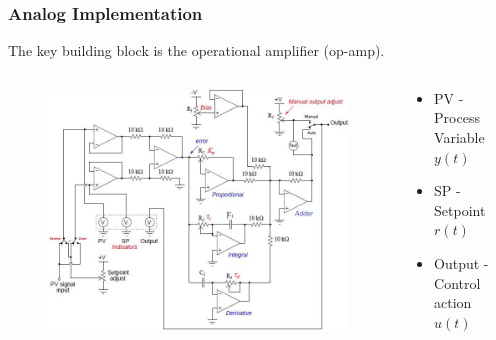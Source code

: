 \begin{frame}
	\frametitle{Analog Implementation}
	The key building block is the operational amplifier (op-amp).
	\begin{columns}
		\begin{column}{0.7 \textwidth}
			\begin{figure}
				\includegraphics[width=1\linewidth]{analog_example2}
			\end{figure}
		\end{column}
		\begin{column}{0.3 \textwidth}
			\tiny{
				\begin{itemize}
					\item PV - Process Variable $y(t)$
					\item SP - Setpoint $r(t)$
					\item Output - Control action $u(t)$
				\end{itemize}
			}
		\end{column}
	\end{columns}
\end{frame}

